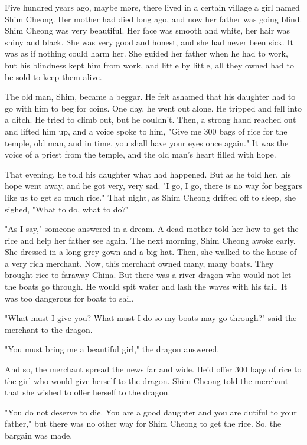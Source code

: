 Five hundred years ago, maybe more, there lived in a certain village a girl named Shim Cheong. Her mother had died long ago, and now her father was going blind. Shim Cheong was very beautiful. Her face was smooth and white, her hair was shiny and black. She was very good and honest, and she had never been sick. It was as if nothing could harm her. She guided her father when he had to work, but his blindness kept him from work, and little by little, all they owned had to be sold to keep them alive.

The old man, Shim, became a beggar. He felt ashamed that his daughter had to go with him to beg for coins. One day, he went out alone. He tripped and fell into a ditch. He tried to climb out, but he couldn't. Then, a strong hand reached out and lifted him up, and a voice spoke to him, "Give me 300 bags of rice for the temple, old man, and in time, you shall have your eyes once again." It was the voice of a priest from the temple, and the old man's heart filled with hope.

That evening, he told his daughter what had happened. But as he told her, his hope went away, and he got very, very sad. "I go, I go, there is no way for beggars like us to get so much rice." That night, as Shim Cheong drifted off to sleep, she sighed, "What to do, what to do?"

"As I say," someone answered in a dream. A dead mother told her how to get the rice and help her father see again. The next morning, Shim Cheong awoke early. She dressed in a long grey gown and a big hat. Then, she walked to the house of a very rich merchant. Now, this merchant owned many, many boats. They brought rice to faraway China. But there was a river dragon who would not let the boats go through. He would spit water and lash the waves with his tail. It was too dangerous for boats to sail.

"What must I give you? What must I do so my boats may go through?" said the merchant to the dragon.

"You must bring me a beautiful girl," the dragon answered.

And so, the merchant spread the news far and wide. He'd offer 300 bags of rice to the girl who would give herself to the dragon. Shim Cheong told the merchant that she wished to offer herself to the dragon.

"You do not deserve to die. You are a good daughter and you are dutiful to your father," but there was no other way for Shim Cheong to get the rice. So, the bargain was made.

